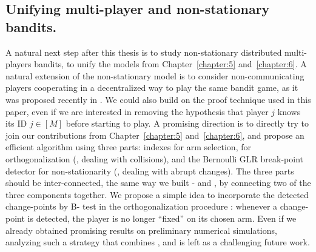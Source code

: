 \subsection*{Unifying multi-player and non-stationary bandits.}
%
%
A natural next step after this thesis is to study non-stationary distributed multi-players bandits, to unify the models from Chapter~\ref{chapter:5} and~\ref{chapter:6}.
A natural extension of the non-stationary model is to consider non-communicating players cooperating in a decentralized way to play the same bandit game, as it was proposed recently in \cite{WeiSrivastava18Distributed}.
%
We could also build on the proof technique used in this paper, even if we are interested in removing the hypothesis that player $j$ knows its ID $j\in[M]$ before starting to play.
%
A promising direction is to directly try to join our contributions from Chapter~\ref{chapter:5} and~\ref{chapter:6}, and propose an efficient algorithm using three parts:
\klUCB{} indexes for arm selection,
\MCTopM{} for orthogonalization (\ie, dealing with collisions),
and the Bernoulli GLR break-point detector for non-stationarity (\ie, dealing with abrupt changes).
The three parts should be inter-connected, the same way we built \MCTopM-\klUCB{} and \GLRklUCB, by connecting two of the three components together.
We propose a simple idea to incorporate the detected change-points by B-\GLR{} test in the orthogonalization procedure \MCTopM: whenever a change-point is detected, the player is no longer ``fixed'' on its chosen arm.
%
Even if we already obtained promising results on preliminary numerical simulations,
analyzing such a strategy that combines \MCTopM, \GLR{} and \klUCB{} is left as a challenging future work.



